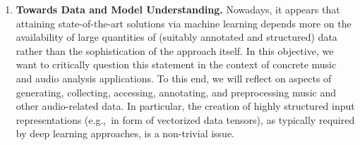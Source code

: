 \documentclass[11pt,a4paper]{article}
\newcommand{\egc}{e.g.,\ }
\theoremstyle{plain} \newtheorem{define}{Definition}[section]
\begin{document}
{\begin{enumerate}
%
%
%
% 


\item \label{objective:renew_understand}
\textbf{Towards Data and Model Understanding.}
% 
Nowadays, it appears that attaining state-of-the-art solutions via machine learning depends more on the availability of large quantities of (suitably annotated and structured) data rather than the sophistication of the approach itself. In this objective, we want to critically question this statement in the context of concrete music and audio analysis applications.
%
To this end, we will reflect on aspects of generating, collecting, accessing, annotating, and preprocessing music and other audio-related data. In particular, the creation of highly structured input representations (\egc in form of vectorized data tensors), as typically required by deep learning approaches, is a non-trivial issue.
%
%

\end{enumerate}}
\end{document}

